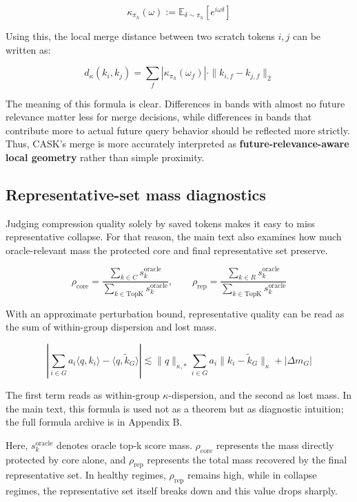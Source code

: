 $$
\kappa_{\pi_h}(\omega)
:=
\mathbb{E}_{\delta \sim \pi_h}
\left[e^{i\omega\delta}\right]
$$


Using this, the local merge distance between two scratch tokens $i, j$ can be written as:


$$
d_{\kappa}(k_i, k_j)
=
\sum_f
\left|\kappa_{\pi_h}(\omega_f)\right|
\cdot
\|k_{i,f} - k_{j,f}\|_2
$$


The meaning of this formula is clear. Differences in bands with almost no future relevance matter less for merge decisions, while differences in bands that contribute more to actual future query behavior should be reflected more strictly. Thus, CASK's merge is more accurately interpreted as \textbf{future-relevance-aware local geometry} rather than simple proximity.


\subsection{Representative-set mass diagnostics}


Judging compression quality solely by saved tokens makes it easy to miss representative collapse. For that reason, the main text also examines how much oracle-relevant mass the protected core and final representative set preserve.


$$
\rho_{\mathrm{core}}
=
\frac{\sum_{k \in C} s_k^{\mathrm{oracle}}}{\sum_{k \in \mathrm{TopK}} s_k^{\mathrm{oracle}}},
\qquad
\rho_{\mathrm{rep}}
=
\frac{\sum_{k \in R} s_k^{\mathrm{oracle}}}{\sum_{k \in \mathrm{TopK}} s_k^{\mathrm{oracle}}}
$$


With an approximate perturbation bound, representative quality can be read as the sum of within-group dispersion and lost mass.


$$
\left|\sum_{i \in G} a_i \langle q, k_i \rangle - \langle q, \tilde{k}_G \rangle\right|
\lesssim
\|q\|_{\kappa,*} \sum_{i \in G} a_i \|k_i - \tilde{k}_G\|_{\kappa}
+
|\Delta m_G|
$$


The first term reads as within-group $\kappa$-dispersion, and the second as lost mass. In the main text, this formula is used not as a theorem but as diagnostic intuition; the full formula archive is in Appendix B.


Here, $s_k^{\mathrm{oracle}}$ denotes oracle top-k score mass. $\rho_{\mathrm{core}}$ represents the mass directly protected by core alone, and $\rho_{\mathrm{rep}}$ represents the total mass recovered by the final representative set. In healthy regimes, $\rho_{\mathrm{rep}}$ remains high, while in collapse regimes, the representative set itself breaks down and this value drops sharply.


